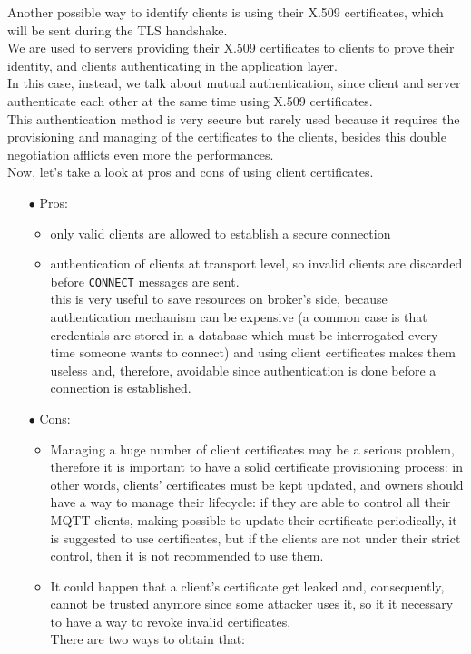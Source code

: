 \documentclass[12pt]{report}
\begin{document}
{Another possible way to identify clients is using their X.509 certificates, which will be sent during the TLS handshake.\\
We are used to servers providing their X.509 certificates to clients to prove their identity, and clients authenticating in the application layer.\\
In this case, instead, we talk about mutual authentication, since client and server authenticate each other at the same time using X.509 certificates.\\
This authentication method is very secure but rarely used because it requires the provisioning and managing of the certificates to the clients, besides this double negotiation afflicts even more the performances.\\

Now, let's take a look at pros and cons of using client certificates.
\begin{itemize}
\setlength{\itemindent}{+4mm}
\item[$\bullet$] Pros:
\begin{itemize}
\item only valid clients are allowed to establish a secure connection
\item authentication of clients at transport level, so invalid clients are discarded before \texttt{CONNECT} messages are sent.\\ this is very useful to save resources on broker's side, because authentication mechanism can be expensive (a common case is that credentials are stored in a database which must be interrogated every time someone wants to connect) and using client certificates makes them useless and, therefore, avoidable since authentication is done before a connection is established.
\end{itemize}

\item[$\bullet$] Cons:
\begin{itemize}
\item Managing a huge number of client certificates may be a serious problem, therefore it is important to have a solid certificate provisioning process: in other words, clients' certificates must be kept updated, and owners should have a way to manage their lifecycle: if they are able to control all their MQTT clients, making possible to update their certificate periodically, it is suggested to use certificates, but if the clients are not under their strict control, then it is not recommended to use them.
\item It could happen that a client's certificate get leaked and, consequently, cannot be trusted anymore since some attacker uses it, so it it necessary to have a way to revoke invalid certificates.\\
There are two ways to obtain that:


\end{itemize}
\end{itemize}}
\end{document}

